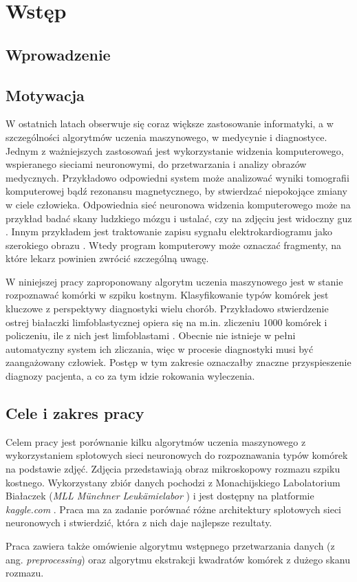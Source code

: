 \chapter{Wstęp}

\section{Wprowadzenie}


\section{Motywacja}

W ostatnich latach obserwuje się coraz większe zastosowanie informatyki, a w szczególności algorytmów uczenia maszynowego,
w medycynie i diagnostyce.
Jednym z ważniejszych zastosowań jest wykorzystanie widzenia komputerowego, wspieranego sieciami neuronowymi, do przetwarzania i analizy obrazów medycznych.
Przykładowo odpowiedni system może analizować wyniki tomografii komputerowej bądź rezonansu magnetycznego, by stwierdzać niepokojące zmiany w ciele człowieka.
Odpowiednia sieć neuronowa widzenia komputerowego może na przykład badać skany ludzkiego mózgu i ustalać, czy na zdjęciu jest widoczny guz \cite{brain_tumor}.
Innym przykładem jest traktowanie zapisu sygnału elektrokardiogramu jako szerokiego
obrazu \cite{ecg_cnn}.
Wtedy program komputerowy może oznaczać fragmenty, na które lekarz powinien zwrócić szczególną uwagę.

W niniejszej pracy zaproponowany algorytm uczenia maszynowego jest w stanie rozpoznawać komórki w szpiku kostnym.
Klasyfikowanie typów komórek jest kluczowe z perspektywy diagnostyki wielu chorób.
Przykładowo stwierdzenie ostrej białaczki limfoblastycznej opiera się na m.in.
zliczeniu 1000 komórek i policzeniu, ile z nich jest limfoblastami \cite{blast_counting_diagnosis}.
Obecnie nie istnieje w pełni automatyczny system ich zliczania, więc w procesie diagnostyki musi być zaangażowany człowiek.
Postęp w tym zakresie oznaczałby znaczne przyspieszenie diagnozy pacjenta, a co za tym idzie rokowania wyleczenia.

\section{Cele i zakres pracy}

Celem pracy jest porównanie kilku algorytmów uczenia maszynowego z wykorzystaniem splotowych sieci neuronowych do rozpoznawania typów komórek na podstawie zdjęć.
Zdjęcia przedstawiają obraz mikroskopowy rozmazu szpiku kostnego. Wykorzystany zbiór danych pochodzi z
Monachijskiego Labolatorium Białaczek (\textit{MLL Münchner Leukämielabor} \cite{mll}) i jest dostępny na platformie \textit{kaggle.com} \cite{dataset}.
Praca ma za zadanie porównać różne architektury splotowych sieci neuronowych i stwierdzić, która z nich daje najlepsze rezultaty.

Praca zawiera także omówienie algorytmu wstępnego przetwarzania danych (z ang. \textit{preprocessing}) oraz algorytmu ekstrakcji kwadratów komórek z dużego skanu rozmazu.
